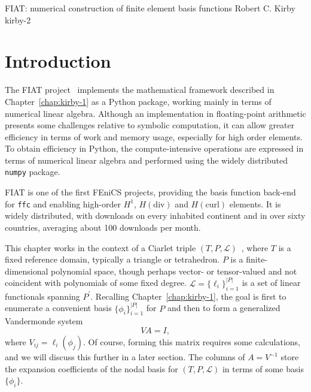               {FIAT: numerical construction of finite element basis functions}
              {Robert C. Kirby}
              {kirby-2}

\section{Introduction}

The FIAT project~\citep{Kirby2004,Kirby2006} implements the mathematical
framework described in Chapter~\ref{chap:kirby-1} as a Python package,
working mainly in terms of numerical linear algebra.  Although an
implementation in floating-point arithmetic presents some challenges
relative to symbolic computation, it can allow greater efficiency in
terms of work and memory usage, especially for high order elements.
To obtain efficiency in Python, the compute-intensive operations are
expressed in terms of numerical linear algebra and performed using the
widely distributed \texttt{numpy} package.

FIAT is one of the first FEniCS projects, providing the basis function
back-end for \texttt{ffc} and enabling high-order \( H^1 \), \(
H(\mathrm{div}) \) and \( H(\mathrm{curl}) \) elements. It is widely
distributed, with downloads on every inhabited continent and in over
sixty countries, averaging about 100 downloads per month.

This chapter works in the context of a Ciarlet triple \( (T,P,\mathcal{L})
\)~\citep{Ciarlet2002}, where \( T \) is a fixed reference domain,
typically a triangle or tetrahedron.  \( P \) is a finite-dimensional
polynomial space, though perhaps vector- or tensor-valued and not
coincident with polynomials of some fixed degree.  \( \mathcal{L} =
\{ \ell_i \}_{i=1}^{|P|} \) is a set of linear functionals spanning \(
P^\prime \).  Recalling Chapter~\ref{chap:kirby-1}, the goal is first
to enumerate a convenient basis \( \{ \phi_i \}_{i=1}^{|P|} \) for \(
P \) and then to form a generalized Vandermonde system
\begin{equation}
  V A = I,
\end{equation}
where \( V_{ij} = \ell_i( \phi_j) \).  Of course, forming this matrix
requires some calculations, and we will discuss this further in a later
section.  The columns of \( A = V^{-1} \) store the expansion coefficients
of the nodal basis for \( (T,P,\mathcal{L}) \) in terms of some basis \(
\{ \phi_i \} \).


